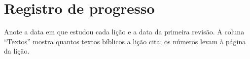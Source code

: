 \chapter{Registro de progresso}

Anote a data em que estudou cada lição e a data da primeira revisão. A coluna
\enquote{Textos} mostra quantos textos bíblicos a lição cita; os números
levam à página da lição.

\progresso
